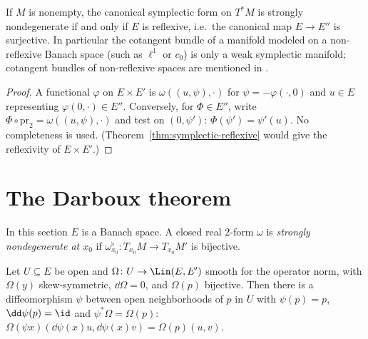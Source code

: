\begin{theorem}
  \label{thm:cotangent-strong}
  \leanok
  If $M$ is nonempty, the canonical symplectic form on $T^*M$ is strongly nondegenerate if and
  only if $E$ is reflexive, i.e.\ the canonical map $E \to E''$ is surjective. In particular the
  cotangent bundle of a manifold modeled on a non-reflexive Banach space (such as $\ell^1$ or
  $c_0$) is only a weak symplectic manifold; cotangent bundles of non-reflexive spaces are
  mentioned in \cite[p.~590]{Mar72}.
\end{theorem}

\begin{proof}
  \leanok
  A functional $\varphi$ on $E \times E'$ is $\omega((u, \psi), \cdot)$ for $\psi =
  -\varphi(\cdot, 0)$ and $u \in E$ representing $\varphi(0, \cdot) \in E''$. Conversely, for
  $\Phi \in E''$, write $\Phi \circ \mathrm{pr}_2 = \omega((u, \psi), \cdot)$ and test on $(0,
  \psi')$: $\Phi(\psi') = \psi'(u)$. No completeness is used. (Theorem~\ref{thm:symplectic-reflexive}
  would give the reflexivity of $E \times E'$.)
\end{proof}

\section{The Darboux theorem}
\label{sec:darboux}

In this section $E$ is a Banach space. A closed real $2$-form $\omega$ is \emph{strongly
nondegenerate at $x_0$} if $\omega^\flat_{x_0} \colon T_{x_0}M \to T_{x_0}M'$ is bijective.

\begin{theorem}
  \label{thm:darboux-local}
  \leanok
  Let $U \subseteq E$ be open and $\Omega \colon U \to \Lin(E, E')$ smooth for the operator norm,
  with $\Omega(y)$ skew-symmetric, $\dd\Omega = 0$, and $\Omega(p)$ bijective. Then there is a
  diffeomorphism $\psi$ between open neighborhoods of $p$ in $U$ with $\psi(p) = p$,
  $\dd\psi(p) = \id$ and $\psi^*\Omega = \Omega(p)$:
  $\Omega(\psi x)(\dd\psi(x) u, \dd\psi(x) v) = \Omega(p)(u, v)$.
\end{theorem}

